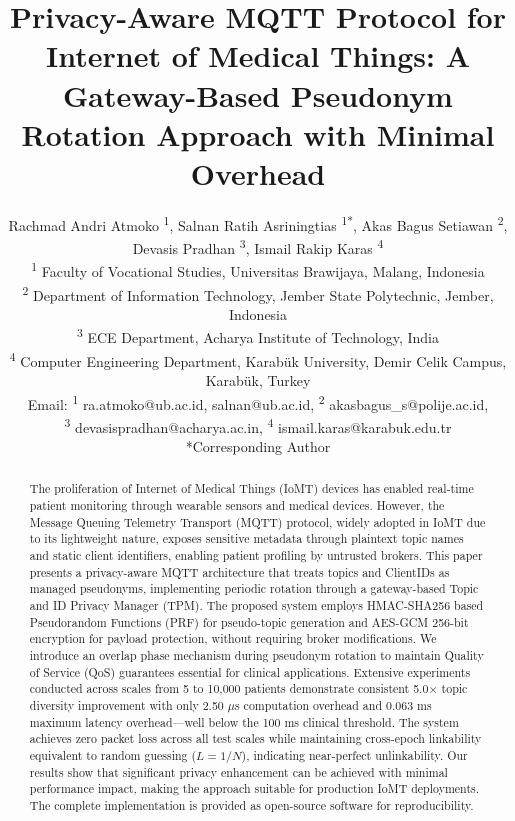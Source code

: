 \documentclass[conference]{IEEEtran}
\begin{document}
\title{Privacy-Aware MQTT Protocol for Internet of Medical Things: A Gateway-Based Pseudonym Rotation Approach with Minimal Overhead}

\author{Rachmad Andri Atmoko \textsuperscript{1}, Salnan Ratih Asriningtias \textsuperscript{1*}, Akas Bagus Setiawan \textsuperscript{2}, Devasis Pradhan \textsuperscript{3}, Ismail Rakip Karas \textsuperscript{4}\\
\textsuperscript{1} Faculty of Vocational Studies, Universitas Brawijaya, Malang, Indonesia \\
\textsuperscript{2} Department of Information Technology, Jember State Polytechnic, Jember, Indonesia \\
\textsuperscript{3} ECE Department, Acharya Institute of Technology, India \\
\textsuperscript{4} Computer Engineering Department, Karabük University, Demir Celik Campus, Karabük, Turkey \\
Email: \textsuperscript{1} ra.atmoko@ub.ac.id, salnan@ub.ac.id, \textsuperscript{2} akasbagus\_s@polije.ac.id,\\
\textsuperscript{3} devasispradhan@acharya.ac.in, \textsuperscript{4} ismail.karas@karabuk.edu.tr\\
*Corresponding Author
}

\maketitle

\begin{abstract}
The proliferation of Internet of Medical Things (IoMT) devices has enabled real-time patient monitoring through wearable sensors and medical devices. However, the Message Queuing Telemetry Transport (MQTT) protocol, widely adopted in IoMT due to its lightweight nature, exposes sensitive metadata through plaintext topic names and static client identifiers, enabling patient profiling by untrusted brokers. This paper presents a privacy-aware MQTT architecture that treats topics and ClientIDs as managed pseudonyms, implementing periodic rotation through a gateway-based Topic and ID Privacy Manager (TPM). The proposed system employs HMAC-SHA256 based Pseudorandom Functions (PRF) for pseudo-topic generation and AES-GCM 256-bit encryption for payload protection, without requiring broker modifications. We introduce an overlap phase mechanism during pseudonym rotation to maintain Quality of Service (QoS) guarantees essential for clinical applications. Extensive experiments conducted across scales from 5 to 10,000 patients demonstrate consistent 5.0$\times$ topic diversity improvement with only 2.50 $\mu$s computation overhead and 0.063 ms maximum latency overhead---well below the 100 ms clinical threshold. The system achieves zero packet loss across all test scales while maintaining cross-epoch linkability equivalent to random guessing ($L = 1/N$), indicating near-perfect unlinkability. Our results show that significant privacy enhancement can be achieved with minimal performance impact, making the approach suitable for production IoMT deployments. The complete implementation is provided as open-source software for reproducibility.
\end{abstract}
\end{document}

